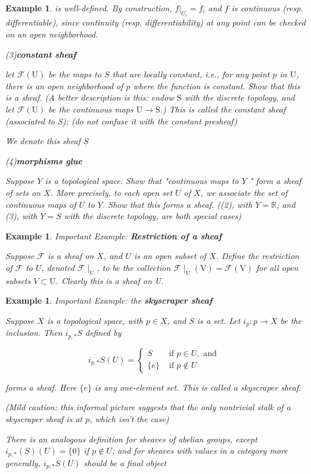 \documentclass{article}
\newtheorem{example}[theorem]{Example}
\begin{document}
\begin{example}
is well-defined. By construction, $\left.f\right|_{U_{i}}=f_{i}$ and $f$ is continuous (resp. differentiable), since continuity (resp. differentiability) at any point can be checked on an open neighborhood.

(3)\textbf{constant sheaf }

let $\mathcal{F}(\mathrm{U})$ be the maps to $S$ that are locally constant, i.e., for any point $p$ in $\mathrm{U}$, there is an open neighborhood of $p$ where the function is constant. Show that this is a sheaf. (A better description is this: endow $\mathrm{S}$ with the discrete topology, and let $\mathcal{F}(\mathrm{U})$ be the continuous maps $\mathrm{U} \rightarrow \mathrm{S}$.) This is called the constant sheaf (associated to S); (do not confuse it with the constant presheaf) 

We denote this sheaf $\underline{S}$

(4)\textbf{morphisms glue}

Suppose $Y$ is a topological space. Show that "continuous maps to $Y$ " form a sheaf of sets on $X$. More precisely, to each open set $U$ of $X$, we associate the set of continuous maps of $U$ to $Y$. Show that this forms a sheaf. ((2), with $Y=\mathbb{R}$, and (3), with $Y=S$ with the discrete topology, are both special cases)
\end{example}
\begin{example}
    Important Example: \textbf{Restriction of a sheaf}
    
    Suppose $\mathcal{F}$ is a sheaf on $X$, and $U$ is an open subset of $X$. Define the restriction of $\mathcal{F}$ to $U$, denoted $\mathcal{F} \mid_ \mathrm{U}$, to be the collection $\mathcal{F} \mid _ \mathrm{U}(\mathrm{V})=\mathcal{F}(\mathrm{V})$ for all open subsets $V \subset \mathrm{U}$. Clearly this is a sheaf on U. 
\end{example}
\begin{example}
Important Example: the \textbf{skyscraper sheaf}

Suppose $X$ is a topological space, with $p \in X$, and $S$ is a set. Let $i_{p}: p \rightarrow X$ be the inclusion. Then $i_{p, *} S$ defined by

$$
i_{p, *} S(U)= \begin{cases}S & \text { if } p \in U, \text { and } \\ \{e\} & \text { if } p \notin U\end{cases}
$$

forms a sheaf. Here $\{e\}$ is any one-element set. This is called a skyscraper sheaf. 

(Mild caution: this informal picture suggests that the only nontrivial stalk of a skyscraper sheaf is at $p$, which isn't the case) 

There is an analogous definition for sheaves of abelian groups, except $i_{p, *}(S)(U)=\{0\}$ if $p \notin U$; and for sheaves with values in a category more generally, $i_{p, *} S(U)$ should be a final object
\end{example}
\end{document}
